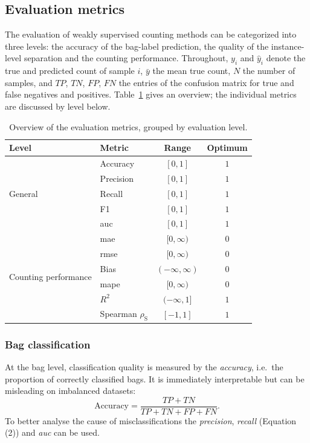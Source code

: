 \documentclass[12pt,parskip = half, DIV=classic,listof=totoc]{scrartcl}
\begin{document}
		\subsection{Evaluation metrics}\label{sec:metrics}
			The evaluation of weakly supervised counting methods can be categorized into three levels: 
			the accuracy of the bag-label prediction, the quality of the instance-level separation and 
			the counting performance. Throughout, $y_i$ and $\hat{y}_i$ denote the true and predicted count of
			sample $i$, $\bar{y}$ the mean true count, $N$ the number of samples, and
			$TP$, $TN$, $FP$, $FN$ the entries of the confusion matrix for true and false negatives and positives.
			 Table~\ref{tab:metrics} gives an overview; the individual metrics are discussed by level below.

			\begin{table}[htbp]
				\centering
				\caption[Overview of the evaluation metrics, grouped by evaluation level]{Overview of the evaluation metrics, grouped by evaluation level.}
				\label{tab:metrics}
				\begin{tabular}{@{}llcc@{}}
					\toprule
					Level & Metric & Range & Optimum \\
					\midrule
					\multirow{5}{*}{General}
						& Accuracy & $[0,1]$ & $1$ \\
						& Precision & $[0,1]$ & $1$ \\
						& Recall    & $[0,1]$ & $1$ \\
						& F1        & $[0,1]$ & $1$ \\
						& \acs*{auc}  		& $[0,1]$ & $1$ \\
					\midrule
					\multirow{6}{*}{Counting performance}
						& \acs*{mae}   & $[0,\infty)$       & $0$ \\
						& \acs*{rmse}  & $[0,\infty)$       & $0$ \\
						& Bias  & $(-\infty,\infty)$ & $0$ \\
						& \acs*{mape}  & $[0,\infty)$       & $0$ \\
						& $R^2$ & $(-\infty,1]$      & $1$ \\
						& Spearman $\rho_{\text{S}}$ & $[-1,1]$ & $1$ \\
					\bottomrule
				\end{tabular}
			\end{table}

			\subsubsection*{Bag classification}
				At the bag level, classification quality is measured by the \emph{accuracy},
				i.e.\ the proportion of correctly classified bags. It is immediately
				interpretable but can be misleading on imbalanced datasets:
				\begin{equation}
					\mathrm{Accuracy} = \frac{TP + TN}{TP + TN + FP + FN} .
				\end{equation}
				To better analyse the cause of misclassifications the \emph{precision}, \emph{recall} (Equation (2)) and \emph{\ac{auc}} 
				can be used.
\end{document}
